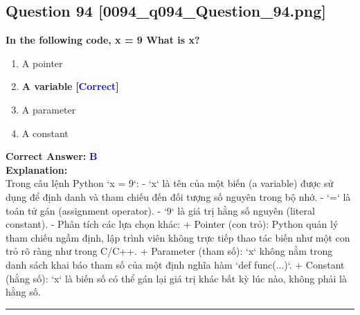 \documentclass[11pt,a4paper]{article}
\begin{document}
\begin{minipage}{\textwidth}
\subsection*{Question 94 \quad \footnotesize{[0094_q094_Question_94.png]}}
\noindent \textbf{In the following code, x = 9 What is x?}

\begin{enumerate}[label=\Alph*.]
    \item A pointer
    \item \textbf{A variable} \hfill \textcolor{blue}{\textbf{[Correct]}}
    \item A parameter
    \item A constant
\end{enumerate}

\noindent \textbf{Correct Answer:} \textcolor{blue}{\textbf{B}} \\[4pt]
\noindent \textbf{Explanation:}\\
Trong câu lệnh Python `x = 9`:\newline
- `x` là tên của một biến (a variable) được sử dụng để định danh và tham chiếu đến đối tượng số nguyên trong bộ nhớ.\newline
- `=` là toán tử gán (assignment operator).\newline
- `9` là giá trị hằng số nguyên (literal constant).\newline
- Phân tích các lựa chọn khác:\newline
  + Pointer (con trỏ): Python quản lý tham chiếu ngầm định, lập trình viên không trực tiếp thao tác biến như một con trỏ rõ ràng như trong C/C++.\newline
  + Parameter (tham số): `x` không nằm trong danh sách khai báo tham số của một định nghĩa hàm `def func(...)`.\newline
  + Constant (hằng số): `x` là biến số có thể gán lại giá trị khác bất kỳ lúc nào, không phải là hằng số.
\end{minipage}
\vspace{0.8cm}
\hrule
\vspace{0.5cm}
\end{document}
